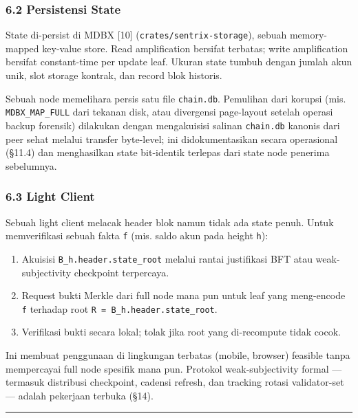 \documentclass[11pt,a4paper]{article}
\providecommand{\tightlist}{\setlength{\itemsep}{0pt}\setlength{\parskip}{0pt}}
\begin{document}
\hypertarget{persistensi-state}{%
\subsubsection{6.2 Persistensi State}\label{persistensi-state}}

State di-persist di MDBX {[}10{]} (\texttt{crates/sentrix-storage}), sebuah memory-mapped key-value store. Read amplification bersifat terbatas; write amplification bersifat constant-time per update leaf. Ukuran state tumbuh dengan jumlah akun unik, slot storage kontrak, dan record blok historis.

Sebuah node memelihara persis satu file \texttt{chain.db}. Pemulihan dari korupsi (mis. \texttt{MDBX\_MAP\_FULL} dari tekanan disk, atau divergensi page-layout setelah operasi backup forensik) dilakukan dengan mengakuisisi salinan \texttt{chain.db} kanonis dari peer sehat melalui transfer byte-level; ini didokumentasikan secara operasional (§11.4) dan menghasilkan state bit-identik terlepas dari state node penerima sebelumnya.

\hypertarget{light-client}{%
\subsubsection{6.3 Light Client}\label{light-client}}

Sebuah light client melacak header blok namun tidak ada state penuh. Untuk memverifikasi sebuah fakta \texttt{f} (mis. saldo akun pada height \texttt{h}):

\begin{enumerate}
\def\labelenumi{\arabic{enumi}.}
\tightlist
\item
  Akuisisi \texttt{B\_h.header.state\_root} melalui rantai justifikasi BFT atau weak-subjectivity checkpoint terpercaya.
\item
  Request bukti Merkle dari full node mana pun untuk leaf yang meng-encode \texttt{f} terhadap root \texttt{R\ =\ B\_h.header.state\_root}.
\item
  Verifikasi bukti secara lokal; tolak jika root yang di-recompute tidak cocok.
\end{enumerate}

Ini membuat penggunaan di lingkungan terbatas (mobile, browser) feasible tanpa mempercayai full node spesifik mana pun. Protokol weak-subjectivity formal --- termasuk distribusi checkpoint, cadensi refresh, dan tracking rotasi validator-set --- adalah pekerjaan terbuka (§14).

\begin{center}\rule{0.5\linewidth}{0.5pt}\end{center}
\end{document}
